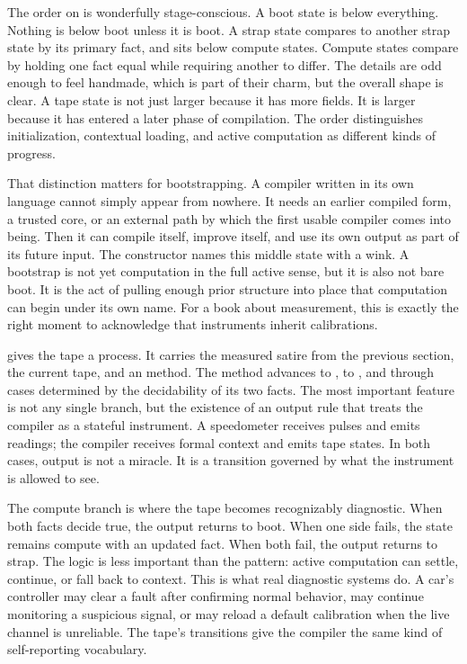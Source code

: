 The order on  is wonderfully stage-conscious. A boot state
is below everything. Nothing is below boot unless it is boot. A strap state
compares to another strap state by its primary fact, and sits below compute
states. Compute states compare by holding one fact equal while requiring
another to differ. The details are odd enough to feel handmade, which is part
of their charm, but the overall shape is clear. A tape state is not just
larger because it has more fields. It is larger because it has entered a later
phase of compilation. The order distinguishes initialization, contextual
loading, and active computation as different kinds of progress.

That distinction matters for bootstrapping. A compiler written in its own
language cannot simply appear from nowhere. It needs an earlier compiled form,
a trusted core, or an external path by which the first usable compiler comes
into being. Then it can compile itself, improve itself, and use its own output
as part of its future input. The  constructor names this middle
state with a wink. A bootstrap is not yet computation in the full active
sense, but it is also not bare boot. It is the act of pulling enough prior
structure into place that computation can begin under its own name. For a book
about measurement, this is exactly the right moment to acknowledge that
instruments inherit calibrations.

 gives the tape a process. It carries the measured satire
from the previous section, the current tape, and an  method. The
method advances  to ,  to ,
and  through cases determined by the decidability of its two
facts. The most important feature is not any single branch, but the existence
of an output rule that treats the compiler as a stateful instrument. A
speedometer receives pulses and emits readings; the compiler receives formal
context and emits tape states. In both cases, output is not a miracle. It is a
transition governed by what the instrument is allowed to see.

The compute branch is where the tape becomes recognizably diagnostic. When
both facts decide true, the output returns to boot. When one side fails, the
state remains compute with an updated fact. When both fail, the output returns
to strap. The logic is less important than the pattern: active computation can
settle, continue, or fall back to context. This is what real diagnostic systems
do. A car's controller may clear a fault after confirming normal behavior, may
continue monitoring a suspicious signal, or may reload a default calibration
when the live channel is unreliable. The tape's transitions give the compiler
the same kind of self-reporting vocabulary.

